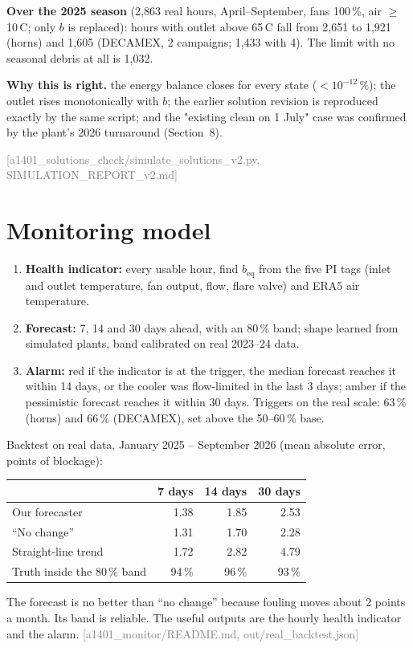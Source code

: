 \documentclass[11pt,a4paper]{article}
\newcommand{\src}[1]{\textcolor{gray}{\small[#1]}}
\newcommand{\why}[1]{\par\noindent\textbf{Why this is right.} #1\par}
\begin{document}
\noindent\textbf{Over the 2025 season} (2{,}863 real hours, April--September, fans 100\,\%, air $\ge$ 10\,\textdegree C; only $b$ is replaced): hours with outlet above 65\,\textdegree C fall from 2{,}651 to 1{,}921 (horns) and 1{,}605 (DECAMEX, 2 campaigns; 1{,}433 with 4). The limit with no seasonal debris at all is 1{,}032.
\why{the energy balance closes for every state ($<10^{-12}\,\%$); the outlet rises monotonically with $b$; the earlier solution revision is reproduced exactly by the same script; and the "existing clean on 1 July" case was confirmed by the plant's 2026 turnaround (Section~8).}
\src{a1401\_solutions\_check/simulate\_solutions\_v2.py, SIMULATION\_REPORT\_v2.md}

\section{Monitoring model}

\begin{enumerate}
\item \textbf{Health indicator:} every usable hour, find $b_\text{eq}$ from the five PI tags (inlet and outlet temperature, fan output, flow, flare valve) and ERA5 air temperature.
\item \textbf{Forecast:} 7, 14 and 30 days ahead, with an 80\,\% band; shape learned from simulated plants, band calibrated on real 2023--24 data.
\item \textbf{Alarm:} red if the indicator is at the trigger, the median forecast reaches it within 14 days, or the cooler was flow-limited in the last 3 days; amber if the pessimistic forecast reaches it within 30 days. Triggers on the real scale: 63\,\% (horns) and 66\,\% (DECAMEX), set above the 50--60\,\% base.
\end{enumerate}
Backtest on real data, January 2025 -- September 2026 (mean absolute error, points of blockage):
\begin{center}\small\setlength{\tabcolsep}{4pt}\begin{tabular}{lrrr}
\toprule
& 7 days & 14 days & 30 days\\\midrule
Our forecaster & 1.38 & 1.85 & 2.53\\
``No change'' & 1.31 & 1.70 & 2.28\\
Straight-line trend & 1.72 & 2.82 & 4.79\\
Truth inside the 80\,\% band & 94\,\% & 96\,\% & 93\,\%\\
\bottomrule\end{tabular}\end{center}
The forecast is no better than ``no change'' because fouling moves about 2 points a month. Its band is reliable. The useful outputs are the hourly health indicator and the alarm.
\src{a1401\_monitor/README.md, out/real\_backtest.json}
\end{document}
